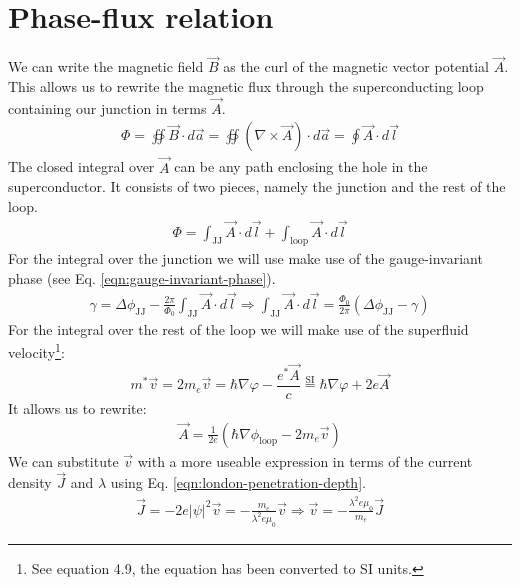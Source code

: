 \section{Phase-flux relation}
\label{app:phase-flux-relation}
We can write the magnetic field $\vec{B}$ as the curl of the magnetic vector potential $\vec{A}$. This allows us to rewrite the magnetic flux through the superconducting loop containing our junction in terms $\vec{A}$.
\begin{align}
	\Phi = \oiint \vec{B} \cdot d\vec{a} = \oiint \left(\nabla \times \vec{A}\right) \cdot d\vec{a} = \oint \vec{A} \cdot d\vec{l}
\end{align}
The closed integral over $\vec{A}$ can be any path enclosing the hole in the superconductor. It consists of two pieces, namely the junction and the rest of the loop.
\begin{align}
	\Phi = \int_{\text{JJ}} \vec{A} \cdot d\vec{l} + \int_{\text{loop}} \vec{A} \cdot d\vec{l}
	\label{eqn:magnetic-potential-integral}
\end{align}
For the integral over the junction we will use make use of the gauge-invariant phase (see Eq. \ref{eqn:gauge-invariant-phase}).
\begin{align}
	\gamma = \Delta\phi_{\text{JJ}} - \frac{2\pi}{\Phi_0}\int_{\text{JJ}}\vec{A} \cdot d\vec{l} \Rightarrow \int_{\text{JJ}}\vec{A} \cdot d\vec{l} = \frac{\Phi_0}{2\pi} \left(\Delta\phi_{\text{JJ}} - \gamma\right)
\end{align}
For the integral over the rest of the loop we will make use of the superfluid velocity\footnote{See  equation 4.9, the equation has been converted to SI units.}:
\begin{equation}
	m^*\vec{v} = 2m_e\vec{v} = \hbar \nabla \varphi - \frac{e^*\vec{A}}{c} \stackrel{\text{SI}}{=} \hbar \nabla \varphi + 2e\vec{A}
	\label{eqn:superfluid-velocity}
\end{equation}
It allows us to rewrite:
\begin{align}
	\vec{A} = \frac{1}{2e}\left(\hbar \nabla \phi_{\text{loop}} - 2m_e\vec{v}\right)
\end{align}
We can substitute $\vec{v}$ with a more useable expression in terms of the current density $\vec{J}$ and $\lambda$ using Eq. \ref{eqn:london-penetration-depth}.
\begin{align}
	\vec{J} = -2e|\psi|^2\vec{v} = -\frac{m_e}{\lambda^2e\mu_0}\vec{v} \Rightarrow \vec{v} = -\frac{\lambda^2e\mu_0}{m_e}\vec{J}
\end{align}
